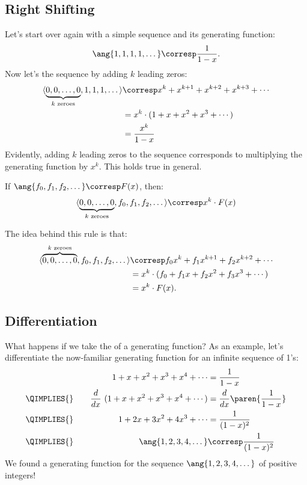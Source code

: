 \subsection{Right Shifting}

Let's start over again with a simple sequence and its generating
function:
%
\[
    \ang{1, 1, 1, 1, \dots} \corresp \frac{1}{1-x}.
\]
%
Now let's  the sequence by adding $k$ leading
zeros:
%
\begin{align*}
\langle\underbrace{0, 0, \dots, 0}_{\text{$k$ zeroes}}, 1, 1, 1, \dots\rangle
        & \corresp x^k + x^{k+1} + x^{k+2} + x^{k+3} + \cdots \\
        & = x^k \cdot (1  + x + x^2 + x^3 + \cdots) \\
        & = \frac{x^k}{1-x}
\end{align*}
%
Evidently, adding $k$ leading zeros to the sequence corresponds to
multiplying the generating function by $x^k$.  This holds true in
general.

\begin{rul}
\label{rule:shift}
If $\ang{f_0, f_1, f_2, \dots} \corresp F(x)$, then:
%
\[
\langle \underbrace{0, 0, \dots, 0}_{\text{$k$ zeroes}}, f_0, f_1, f_2, \dots\rangle \corresp x^k \cdot F(x)
\]
\end{rul}

The idea behind this rule is that:
\begin{align*}
\langle\overbrace{0, 0, \dots, 0}^{\text{$k$ zeroes}}, f_0, f_1, f_2, \dots\rangle
    & \corresp f_0 x^k + f_1 x^{k+1} + f_2 x^{k+2} + \cdots \\
    & = x^k \cdot (f_0 + f_1 x + f_2 x^2 + f_3 x^3 + \cdots) \\
    & = x^k \cdot F(x).
\end{align*}

\subsection{Differentiation}

What happens if we take the  of a generating
function?  As an example, let's differentiate the now-familiar
generating function for an infinite sequence of 1's:
%
\begin{alignat}{2}
&\quad&
    1 + x + x^2 + x^3 + x^4 + \cdots
        & {}= \frac{1}{1-x} \notag\\
{}\QIMPLIES{}
    &&\frac{d}{dx} \ (1 + x + x^2 + x^3 + x^4 + \cdots)
        & = \frac{d}{dx} \paren{\frac{1}{1-x}} \notag\\
{}\QIMPLIES{}&&
    1 + 2x + 3x^2 + 4x^3 + \cdots & = \frac{1}{(1-x)^2} \label{sumixi-1}\\
{}\QIMPLIES{}&&
    \ang{1, 2, 3, 4, \dots}  & \corresp \frac{1}{(1-x)^2}\notag
\end{alignat}
%
We found a generating function for the sequence $\ang{1, 2, 3, 4,
\dots}$ of positive integers!

